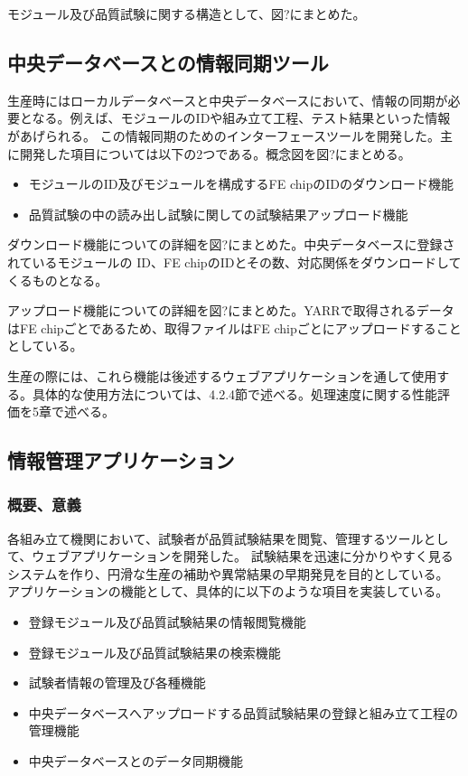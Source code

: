 モジュール及び品質試験に関する構造として、図?にまとめた。

\subsection{中央データベースとの情報同期ツール}
生産時にはローカルデータベースと中央データベースにおいて、情報の同期が必要となる。例えば、モジュールのIDや組み立て工程、テスト結果といった情報があげられる。
この情報同期のためのインターフェースツールを開発した。主に開発した項目については以下の2つである。概念図を図?にまとめる。
\begin{itemize}
  \item モジュールのID及びモジュールを構成するFE chipのIDのダウンロード機能
  \item 品質試験の中の読み出し試験に関しての試験結果アップロード機能
\end{itemize}

ダウンロード機能についての詳細を図?にまとめた。中央データベースに登録されているモジュールの ID、FE chipのIDとその数、対応関係をダウンロードしてくるものとなる。

アップロード機能についての詳細を図?にまとめた。YARRで取得されるデータはFE chipごとであるため、取得ファイルはFE chipごとにアップロードすることとしている。

生産の際には、これら機能は後述するウェブアプリケーションを通して使用する。具体的な使用方法については、4.2.4節で述べる。処理速度に関する性能評価を5章で述べる。

\subsection{情報管理アプリケーション}
\subsubsection{概要、意義}
各組み立て機関において、試験者が品質試験結果を閲覧、管理するツールとして、ウェブアプリケーションを開発した。
試験結果を迅速に分かりやすく見るシステムを作り、円滑な生産の補助や異常結果の早期発見を目的としている。
アプリケーションの機能として、具体的に以下のような項目を実装している。

\begin{itemize}
  \item 登録モジュール及び品質試験結果の情報閲覧機能
  \item 登録モジュール及び品質試験結果の検索機能
  \item 試験者情報の管理及び各種機能
  \item 中央データベースへアップロードする品質試験結果の登録と組み立て工程の管理機能
  \item 中央データベースとのデータ同期機能
\end{itemize}

